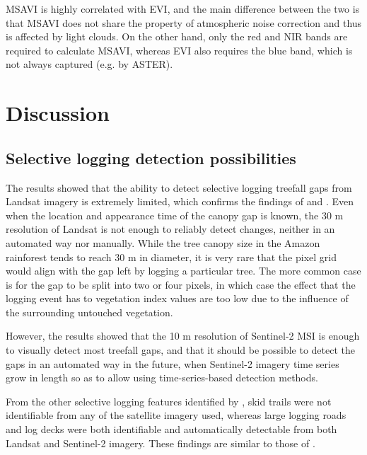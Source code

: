 \documentclass[a4paper,12pt]{scrbook}
\begin{document}
\ac{MSAVI} is highly correlated with \ac{EVI}, and the main difference between the two is that \ac{MSAVI} does not share the property of atmospheric noise correction and thus is affected by light clouds. On the other hand, only the red and \ac{NIR} bands are required to calculate \ac{MSAVI}, whereas \ac{EVI} also requires the blue band, which is not always captured (e.g. by \ac{ASTER}).

\chapter{Discussion}

\section{Selective logging detection possibilities}


The results showed that the ability to detect selective logging treefall gaps from Landsat imagery is extremely limited, which confirms the findings of \citet{asner_remote_2002} and \citet{asner_canopy_2004}. Even when the location and appearance time of the canopy gap is known, the 30 m resolution of Landsat is not enough to reliably detect changes, neither in an automated way nor manually. While the tree canopy size in the Amazon rainforest tends to reach 30 m in diameter, it is very rare that the pixel grid would align with the gap left by logging a particular tree. The more common case is for the gap to be split into two or four pixels, in which case the effect that the logging event has to vegetation index values are too low due to the influence of the surrounding untouched vegetation.

However, the results showed that the 10 m resolution of Sentinel-2 \ac{MSI} is enough to visually detect most treefall gaps, and that it should be possible to detect the gaps in an automated way in the future, when Sentinel-2 imagery time series grow in length so as to allow using time-series-based detection methods.

From the other selective logging features identified by \citet{asner_remote_2002}, skid trails were not identifiable from any of the satellite imagery used, whereas large logging roads and log decks were both identifiable and automatically detectable from both Landsat and Sentinel-2 imagery. These findings are similar to those of \citet{read_spatial_2003}.
\end{document}

